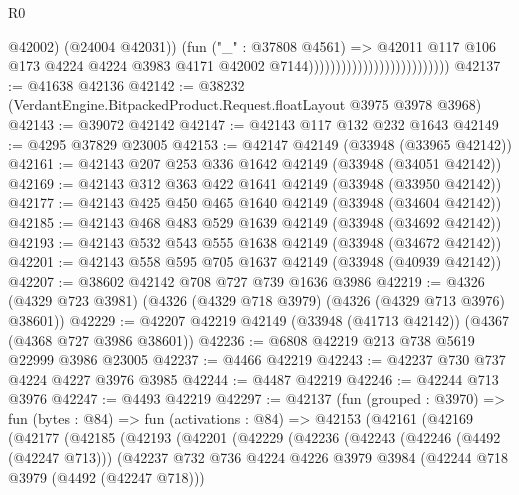 \begin{lexlean}{R0}
\begin{coremodule}
                                                          @42002)
                                                        (@24004 @42031))
                                                      (fun ("_" : @37808 @4561) =>
                                                      @42011
                                                        @117
                                                        @106
                                                        @173
                                                        @4224
                                                        @4224
                                                        @3983
                                                        @4171
                                                        @42002
                                                        @7144))))))))))))))))))))))))))
@42137 := @41638 @42136
@42142 := @38232 (VerdantEngine.BitpackedProduct.Request.floatLayout @3975 @3978 @3968)
@42143 := @39072 @42142
@42147 := @42143 @117 @132 @232 @1643
@42149 := @4295 @37829 @23005
@42153 := @42147 @42149 (@33948 (@33965 @42142))
@42161 := @42143 @207 @253 @336 @1642 @42149 (@33948 (@34051 @42142))
@42169 := @42143 @312 @363 @422 @1641 @42149 (@33948 (@33950 @42142))
@42177 := @42143 @425 @450 @465 @1640 @42149 (@33948 (@34604 @42142))
@42185 := @42143 @468 @483 @529 @1639 @42149 (@33948 (@34692 @42142))
@42193 := @42143 @532 @543 @555 @1638 @42149 (@33948 (@34672 @42142))
@42201 := @42143 @558 @595 @705 @1637 @42149 (@33948 (@40939 @42142))
@42207 := @38602 @42142 @708 @727 @739 @1636 @3986
@42219 := @4326 (@4329 @723 @3981) (@4326 (@4329 @718 @3979) (@4326 (@4329 @713 @3976) @38601))
@42229 := @42207 @42219 @42149 (@33948 (@41713 @42142)) (@4367 (@4368 @727 @3986 @38601))
@42236 := @6808 @42219 @213 @738 @5619 @22999 @3986 @23005
@42237 := @4466 @42219
@42243 := @42237 @730 @737 @4224 @4227 @3976 @3985
@42244 := @4487 @42219
@42246 := @42244 @713 @3976
@42247 := @4493 @42219
@42297 := @42137
    (fun (grouped : @3970) =>
    fun (bytes : @84) =>
    fun (activations : @84) =>
    @42153
      (@42161
        (@42169
          (@42177
            (@42185
              (@42193
                (@42201
                  (@42229
                    (@42236
                      (@42243
                        (@42246 (@4492 (@42247 @713)))
                        (@42237
                          @732
                          @736
                          @4224
                          @4226
                          @3979
                          @3984
                          (@42244 @718 @3979 (@4492 (@42247 @718)))

\end{coremodule}
\end{lexlean}
